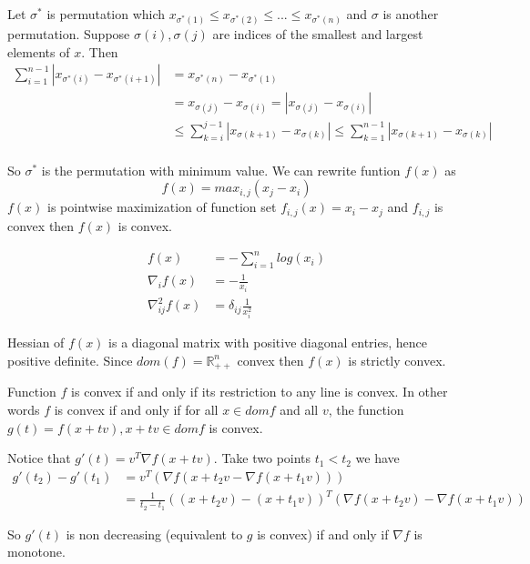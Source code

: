 \documentclass[12pt,letterpaper]{article}
\begin{document}
\begin{alphalist}
\item Let $\sigma^{*}$ is permutation which $x_{\sigma^{*}(1)} \le
    x_{\sigma^{*}(2)} \le...\le x_{\sigma^{*}(n)}$ and $\sigma$ is another
    permutation. Suppose $\sigma(i), \sigma(j)$ are indices of the smallest and
    largest elements of $x$. Then
    \[
        \begin{split}
            \sum_{i=1}^{n-1} |x_{\sigma^{*}(i)} - x_{\sigma^{*}(i+1)}|
            &= x_{\sigma^{*}(n)} - x_{\sigma^{*}(1)} \\
            &= x_{\sigma(j)} - x_{\sigma(i)} = |x_{\sigma(j)} - x_{\sigma(i)}| \\
            &\le \sum_{k=i}^{j-1} | x_{\sigma(k+1)} - x_{\sigma(k)}|
            \le \sum_{k=1}^{n-1} | x_{\sigma(k+1)} - x_{\sigma(k)}| \\
        \end{split}
    \]

    So $\sigma^{*}$ is the permutation with minimum value. We can rewrite
    funtion $f(x)$ as
    \[
        f(x) = max_{i,j} (x_j - x_i)
    \]
    $f(x)$ is pointwise maximization of function set $f_{i,j}(x) = x_i - x_j$
    and $f_{i,j}$ is convex then $f(x)$ is convex.

\item
    \[
        \begin{split}
            f(x) &= -\sum_{i=1}^n log(x_i)\\
            \nabla_{i}f(x) &= -\frac{1}{x_i}\\
            \nabla_{ij}^2 f(x) &= \delta_{ij} \frac{1}{x_i^2}
        \end{split}
    \]

    Hessian of $f(x)$ is a diagonal matrix with positive diagonal entries,
    hence positive definite. Since $dom(f) = \mathbb{R}_{++}^n$ convex then $f(x)$ is strictly convex.

\item
    Function $f$ is convex if and only if its restriction to any line is
    convex. In other words $f$ is convex if and only if for all $x \in dom
    f$ and all $v$, the function $g(t) = f(x + tv), x + tv \in dom f$ is convex.

    Notice that $g'(t) = v^T\nabla f(x + tv)$. Take two points $t_1 < t_2$ we have
    \[
        \begin{split}
            g'(t_2) - g'(t_1) &= v^T(\nabla f(x + t_2v - \nabla f(x + t_1v))) \\
                            &= \frac{1}{t_2-t_1} ((x + t_2v) - (x +
                            t_1v))^T (\nabla f(x + t_2v) - \nabla f(x + t_1v))
        \end{split}
    \]

    So $g'(t)$ is non decreasing (equivalent to $g$ is convex) if and only if $\nabla f$ is monotone.


\end{alphalist}
\end{document}
